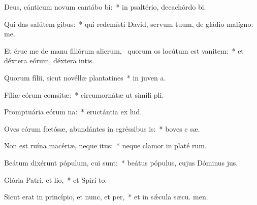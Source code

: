 \item Deus, cánticum novum cantábo bi:~* in psaltério, decachórdo  bi.
\item Qui das salútem gibus:~* qui redemísti David, servum tuum, de gládio malígno:  me.
\item Et érue me de manu filiórum alierum,~\pscross{} quorum os locútum est vanitem:~* et déxtera eórum, déxtera intis.
\item Quorum fílii, sicut novéllæ plantatines~* in juven a.
\item Fíliæ eórum comsitæ:~* circumornátæ ut simili pli.
\item Promptuária eórum na:~* eructántia ex   lud.
\item Oves eórum fœtósæ, abundántes in egréssibus is:~* boves e sæ.
\item Non est ruína macériæ, neque itus:~* neque clamor in platé rum.
\item Beátum dixérunt pópulum, cui  sunt:~* beátus pópulus, cujus Dóminus  jus.
\item Glória Patri, et lio,~* et Spirí to.
\item Sicut erat in princípio, et nunc, et per,~* et in sǽcula sæcu. men.
